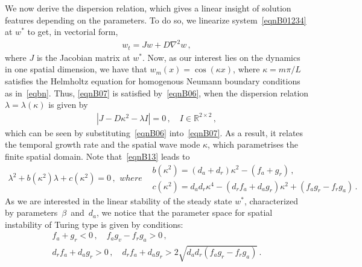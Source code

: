 \documentclass[11pt]{article}
\begin{document}
We now derive the dispersion relation, which gives a linear insight of solution features depending on the parameters. To do so, we linearize system~\eqref{eqnB01234} at $w^*$ to get, in vectorial form,
	\begin{gather}\label{eqnB07}
	w_t = Jw + D \nabla^2 w	\,,
	\end{gather}
	where $J$ is the Jacobian matrix at $w^*$. Now, as our interest lies on the dynamics in one spatial dimension, we have that $w_m(x)=\cos(\kappa x)$, where $\kappa=m\pi/L$ satisfies the Helmholtz equation for homogenous Neumann boundary conditions as in~\eqref{eqbn}. Thus, \eqref{eqnB07} is satisfied by~\eqref{eqnB06}, when the dispersion relation $\lambda=\lambda(\kappa)$ is given by
	\begin{gather}\label{eqnB13}
	|J-D\kappa^2-\lambda I|=0\,, \quad I\in\mathbb{R}^{2\times2}\,,
	\end{gather}
	which can be seen by substituting~\eqref{eqnB06} into~\eqref{eqnB07}. As a result, it relates the temporal growth rate and the spatial wave mode $\kappa$, which parametrises the finite spatial domain. Note that~\eqref{eqnB13} leads to 
	\begin{subequations}\label{eq:lambda}
		\begin{gather}\label{eqnB14}
		\lambda^2 + b(\kappa^2)\lambda + c(\kappa^2) =0\,,
		\end{gather}
		where
		\begin{flalign}
		& b(\kappa^2)=(d_a+d_r)\kappa^2 -(f_a+g_r)\,, \label{eqnB15} \\
		& c(\kappa^2)=d_ad_r\kappa^4-(d_rf_a+d_ag_r)\kappa^2+ (f_ag_r-f_rg_a) \,.\label{eqnB16}
		\end{flalign}
	\end{subequations}
As we are interested in the linear stability of the steady state $w^*$, characterized by parameters~$\beta$~and~$d_a$, we notice that the parameter space for spatial instability of Turing type is given by conditions: 
\begin{subequations} \label{eqnB17}
	\begin{gather}
	f_a+g_r<0\,, \quad f_ag_v-f_rg_a>0 \,, \label{eqnB18} \\
	d_rf_a + d_ag_r > 0 \,, \quad d_rf_a + d_ag_r > 2\sqrt{d_ad_r(f_ag_r-f_rg_a)} \,. \label{eqnB20}%
	\end{gather}
\end{subequations} 
\end{document}
